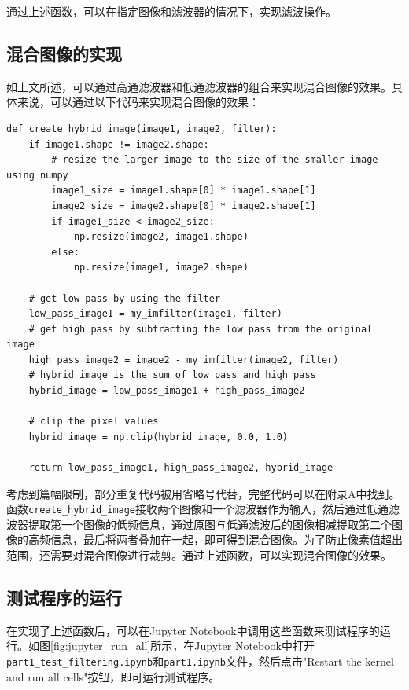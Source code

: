 \documentclass{article}
\begin{document}
通过上述函数，可以在指定图像和滤波器的情况下，实现滤波操作。

\subsection{混合图像的实现}

如上文所述，可以通过高通滤波器和低通滤波器的组合来实现混合图像的效果。具体来说，可以通过以下代码来实现混合图像的效果：

\begin{lstlisting}[style=Python]
def create_hybrid_image(image1, image2, filter):
    if image1.shape != image2.shape:
        # resize the larger image to the size of the smaller image using numpy
        image1_size = image1.shape[0] * image1.shape[1]
        image2_size = image2.shape[0] * image2.shape[1]
        if image1_size < image2_size:
            np.resize(image2, image1.shape)
        else:
            np.resize(image1, image2.shape)
    
    # get low pass by using the filter
    low_pass_image1 = my_imfilter(image1, filter)
    # get high pass by subtracting the low pass from the original image
    high_pass_image2 = image2 - my_imfilter(image2, filter)
    # hybrid image is the sum of low pass and high pass
    hybrid_image = low_pass_image1 + high_pass_image2
    
    # clip the pixel values
    hybrid_image = np.clip(hybrid_image, 0.0, 1.0)
    
    return low_pass_image1, high_pass_image2, hybrid_image
\end{lstlisting}

考虑到篇幅限制，部分重复代码被用省略号代替，完整代码可以在附录A中找到。函数\texttt{create\_hybrid\_image}接收两个图像和一个滤波器作为输入，然后通过低通滤波器提取第一个图像的低频信息，通过原图与低通滤波后的图像相减提取第二个图像的高频信息，最后将两者叠加在一起，即可得到混合图像。为了防止像素值超出范围，还需要对混合图像进行裁剪。通过上述函数，可以实现混合图像的效果。

\subsection{测试程序的运行}

在实现了上述函数后，可以在Jupyter Notebook中调用这些函数来测试程序的运行。如图\ref{fig:jupyter_run_all}所示，在Jupyter Notebook中打开\\\texttt{part1\_test\_filtering.ipynb}和\texttt{part1.ipynb}文件，然后点击"Restart the kernel and run all cells"按钮，即可运行测试程序。
\end{document}
